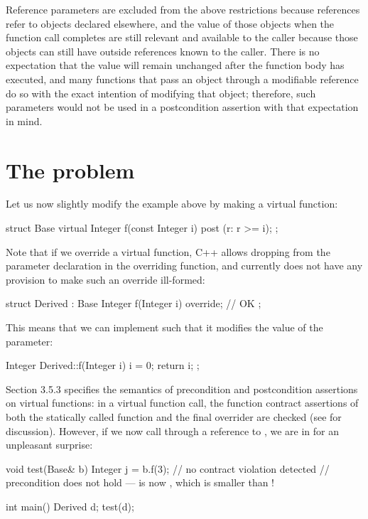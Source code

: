 Reference parameters are excluded from the above restrictions because references refer to objects declared elsewhere, and the value of those objects when the function call completes are still relevant and available to the caller because those objects can still have outside references known to the caller.  
There is no expectation that the value will remain unchanged after the function body has executed, and many functions that pass an object through a modifiable reference do so with the exact intention of modifying that object; therefore, such parameters would not be used in a postcondition assertion with that expectation in mind.

\section{The problem}

Let us now slightly modify the example above by making  a virtual function:
\begin{codeblock}
struct Base {
  virtual Integer f(const Integer i) post (r: r >= i);
};
\end{codeblock}
Note that if we override a virtual function, C++ allows dropping  from the parameter declaration in the overriding function, and \cite{P2900R10} currently does not have any provision to make such an override ill-formed:
\begin{codeblock}
struct Derived : Base {
  Integer f(Integer i) override; // OK
};
\end{codeblock}
This means that we can implement  such that it modifies the value of the parameter:
\begin{codeblock}
Integer Derived::f(Integer i) {
  i = 0;
  return i;
};
\end{codeblock}
\cite{P2900R10} Section 3.5.3 specifies the semantics of precondition and postcondition assertions on virtual functions: in a virtual function call, the function contract assertions of both the statically called function  and the final overrider  are checked (see \cite{P3097R0} for discussion). However, if we now call  through a reference to , we are in for an unpleasant surprise:
\begin{codeblock}
void test(Base& b) {
  Integer j = b.f(3);  // no contract violation detected
  // precondition does not hold ---  is now , which is smaller than !
}

int main() {
  Derived d;
  test(d);
}
\end{codeblock}

